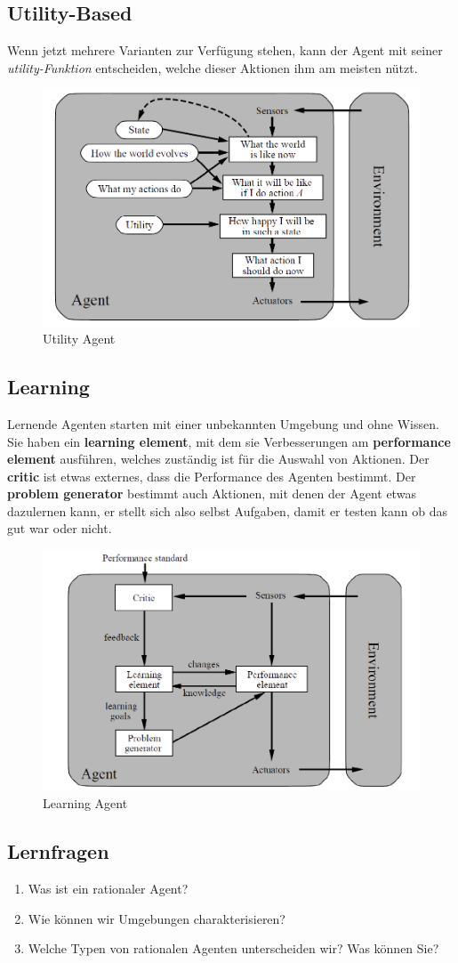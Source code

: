 \subsection{Utility-Based}
Wenn jetzt mehrere Varianten zur Verfügung stehen, kann der Agent mit seiner \textit{utility-Funktion} entscheiden, welche dieser Aktionen ihm am meisten nützt.
\begin{figure}[h]
\centering
\includegraphics[width=0.7\linewidth]{fig/utility_agent}
\caption{Utility Agent}
\label{fig:utility_agent}
\end{figure}

\subsection{Learning}
Lernende Agenten starten mit einer unbekannten Umgebung und ohne Wissen. Sie haben ein \textbf{learning element}, mit dem sie Verbesserungen am \textbf{performance element} ausführen, welches zuständig ist für die Auswahl von Aktionen. Der \textbf{critic} ist etwas externes, dass die Performance des Agenten bestimmt. Der \textbf{problem generator} bestimmt auch Aktionen, mit denen der Agent etwas dazulernen kann, er stellt sich also selbst Aufgaben, damit er testen kann ob das gut war oder nicht.
\begin{figure}[h]
\centering
\includegraphics[width=0.7\linewidth]{fig/learning_agent}
\caption{Learning Agent}
\label{fig:learning_agent}
\end{figure}

\subsection{Lernfragen}
\begin{enumerate}
	\item Was ist ein rationaler Agent?
	\item Wie können wir Umgebungen charakterisieren?
	\item Welche Typen von rationalen Agenten unterscheiden wir? Was können Sie?
\end{enumerate}